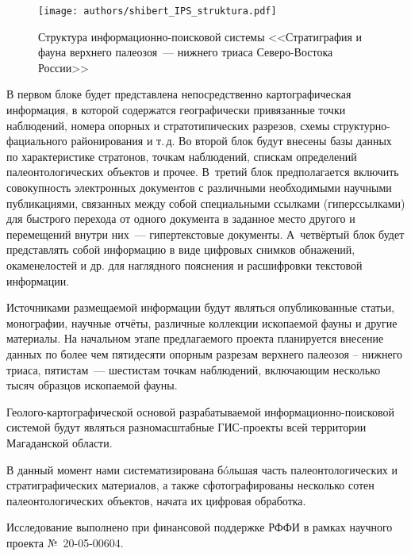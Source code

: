 \begin{figure}[H]
  \centering
  \texttt{[image: authors/shibert\_IPS\_struktura.pdf]}
  \caption{Структура информационно-поисковой системы <<Стратиграфия и фауна верхнего палеозоя~--- нижнего триаса Северо-Востока России>>}
  \label{fig:shibert_IPS_struktura.pdf}
\end{figure}

В первом блоке будет представлена непосредственно картографическая информация, в которой содержатся географически привязанные точки наблюдений, номера опорных и стратотипических разрезов, схемы структурно-фациального районирования и т.\,д. Во второй блок будут внесены базы данных по характеристике стратонов, точкам наблюдений, спискам определений палеонтологических объектов и прочее. В~третий блок предполагается включить совокупность электронных документов с различными необходимыми научными публикациями, связанных между собой специальными ссылками (гиперссылками) для быстрого перехода от одного документа в заданное место другого и перемещений внутри них~--- гипертекстовые документы. А~четвёртый блок будет представлять собой информацию в виде цифровых снимков обнажений, окаменелостей и др. для наглядного пояснения и расшифровки текстовой информации.

Источниками размещаемой информации будут являться опубликованные статьи, монографии, научные отчёты, различные коллекции ископаемой фауны и другие материалы. На начальном этапе предлагаемого проекта планируется внесение данных по более чем пятидесяти опорным разрезам верхнего палеозоя -- нижнего триаса, пятистам~--- шестистам точкам наблюдений, включающим несколько тысяч образцов ископаемой фауны.

Геолого-картографической основой разрабатываемой информационно-поисковой системой будут являться разномасштабные ГИС-проекты всей территории Магаданской области.

В данный момент нами систематизирована бóльшая часть палеонтологических и стратиграфических материалов, а также сфотографированы несколько сотен палеонтологических объектов, начата их цифровая обработка.

Исследование выполнено при финансовой поддержке РФФИ в рамках научного проекта №~20-05-00604.


